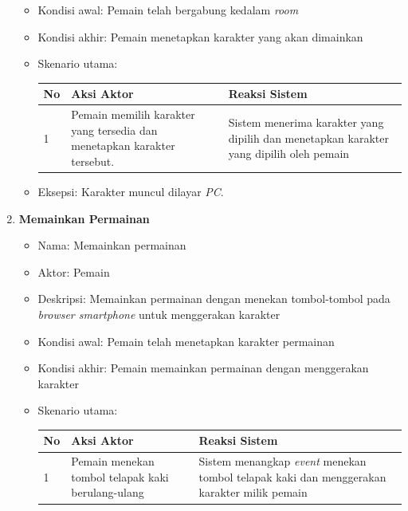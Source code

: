 \begin{enumerate}
\begin{itemize}
		\item Kondisi awal: Pemain telah bergabung kedalam \textit{room}
		
		\item Kondisi akhir: Pemain menetapkan karakter yang akan dimainkan
		
		\item Skenario utama:
		
\begin{tabular}{ |p{1cm}|p{4cm}|p{4cm}|}
	\hline
	No & Aksi Aktor & Reaksi Sistem \\ \hline
	1 & Pemain memilih karakter yang tersedia dan menetapkan karakter tersebut. & Sistem menerima karakter yang dipilih dan menetapkan karakter yang dipilih oleh pemain \\ \hline
\end{tabular}

	\item Eksepsi: Karakter muncul dilayar \textit{PC}.
		
	\end{itemize}
	
	\item \textbf{Memainkan Permainan}
		
		\begin{itemize}
			\item Nama: Memainkan permainan
			
			\item Aktor: Pemain
			
			\item Deskripsi: Memainkan permainan dengan menekan tombol-tombol pada \textit{browser smartphone} untuk menggerakan karakter
			
			\item Kondisi awal: Pemain telah menetapkan karakter permainan
			
			\item Kondisi akhir: Pemain memainkan permainan dengan menggerakan karakter
			
			\item Skenario utama:

\begin{tabular}{ |p{1cm}|p{4cm}|p{4cm}|}
	\hline
	No & Aksi Aktor & Reaksi Sistem \\ \hline
	1 & Pemain menekan tombol telapak kaki berulang-ulang & Sistem menangkap \textit{event} menekan tombol telapak kaki dan menggerakan karakter milik pemain \\ \hline
\end{tabular}
			

\end{itemize}
\end{enumerate}
